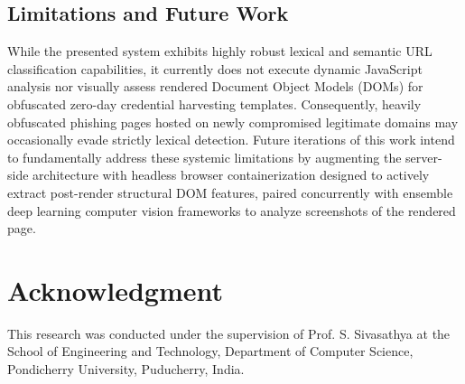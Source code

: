 \documentclass[conference]{IEEEtran}
\begin{document}
\subsection{Limitations and Future Work}
While the presented system exhibits highly robust lexical and semantic URL classification capabilities, it currently does not execute dynamic JavaScript analysis nor visually assess rendered Document Object Models (DOMs) for obfuscated zero-day credential harvesting templates. Consequently, heavily obfuscated phishing pages hosted on newly compromised legitimate domains may occasionally evade strictly lexical detection. Future iterations of this work intend to fundamentally address these systemic limitations by augmenting the server-side architecture with headless browser containerization designed to actively extract post-render structural DOM features, paired concurrently with ensemble deep learning computer vision frameworks to analyze screenshots of the rendered page.

\section*{Acknowledgment}
This research was conducted under the supervision of Prof. S. Sivasathya at the School of Engineering and Technology, Department of Computer Science, Pondicherry University, Puducherry, India.
\end{document}
